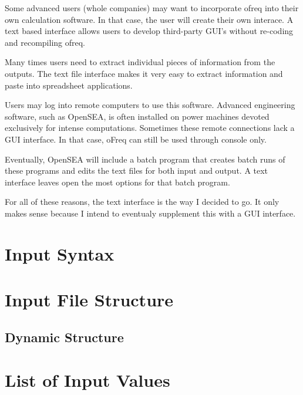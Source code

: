 \begin{DoxyEnumerate}
\item Some advanced users (whole companies) may want to incorporate ofreq into their own calculation software. In that case, the user will create their own interace. A text based interface allows users to develop third-\/party G\-U\-I's without re-\/coding and recompiling ofreq.
\item Many times users need to extract individual pieces of information from the outputs. The text file interface makes it very easy to extract information and paste into spreadsheet applications.
\item Users may log into remote computers to use this software. Advanced engineering software, such as Open\-S\-E\-A, is often installed on power machines devoted exclusively for intense computations. Sometimes these remote connections lack a G\-U\-I interface. In that case, o\-Freq can still be used through console only.
\item Eventually, Open\-S\-E\-A will include a batch program that creates batch runs of these programs and edits the text files for both input and output. A text interface leaves open the most options for that batch program.
\end{DoxyEnumerate}

For all of these reasons, the text interface is the way I decided to go. It only makes sense because I intend to eventualy supplement this with a G\-U\-I interface. \hypertarget{InputSyntax}{}\section{Input Syntax}\label{InputSyntax}
\section*{Input File Structure}

\subsection*{Dynamic Structure}\hypertarget{InputValues}{}\section{List of Input Values}\label{InputValues}
